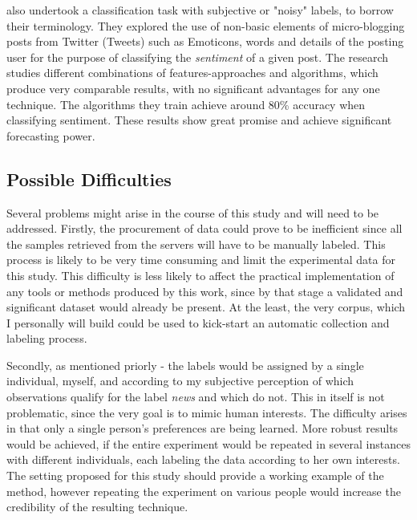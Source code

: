 		\par
		
		\cite*{go2009twitter} also undertook a classification task with subjective or "noisy" labels, to borrow their terminology. They explored the use of non-basic elements of micro-blogging posts from Twitter (Tweets) such as Emoticons, words and details of the posting user for the purpose of classifying the \textit{sentiment} of a given post. The research studies different combinations of features-approaches and algorithms, which produce very comparable results, with no significant advantages for any one technique. The algorithms they train achieve around 80\% accuracy when classifying sentiment. These results show great promise and achieve significant forecasting power.
		
	\subsection{Possible Difficulties}
		Several problems might arise in the course of this study and will need to be addressed. Firstly, the procurement of data could prove to be inefficient since all the samples retrieved from the servers will have to be manually labeled. This process is likely to be very time consuming and limit the experimental data for this study. This difficulty is less likely to affect the practical implementation of any tools or methods produced by this work, since by that stage a validated and significant dataset would already be present. At the least, the very corpus, which I personally will build could be used to kick-start an automatic collection and labeling process.
		
		\par 
		
		Secondly, as mentioned priorly - the labels would be assigned by a single individual, myself, and according to my subjective perception of which observations qualify for the label \textit{news} and which do not. This in itself is not problematic, since the very goal is to mimic human interests. The difficulty arises in that only a single person's preferences are being learned. More robust results would be achieved, if the entire experiment would be repeated in several instances with different individuals, each labeling the data according to her own interests. The setting proposed for this study should provide a working example of the method, however repeating the experiment on various people would increase the credibility of the resulting technique. 
		
